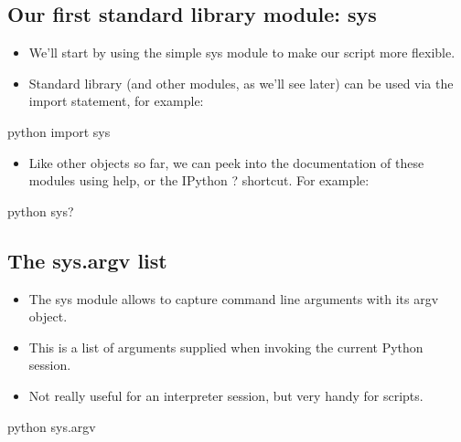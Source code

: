 \documentclass[aspectratio=1610,slidestop]{beamer}
\begin{document}
\subsection{Our first standard library module: sys}
\begin{pframe}
 \begin{itemize}
  \item We'll start by using the simple sys module to make our script more
  flexible.
  \item Standard library (and other modules, as we'll see later) can be used
  via the import statement, for example:
 \end{itemize}

 \begin{ipython}
   \begin{pythonin}{python}
import sys
   \end{pythonin}
 \end{ipython}

\begin{itemize}
 \item Like other objects so far, we can peek into the documentation of these
 modules using help, or the IPython ? shortcut. For example:
\end{itemize}
 \begin{ipython}
   \begin{pythonin}{python}
sys?
   \end{pythonin}
 \end{ipython}
\end{pframe}


\subsection{The sys.argv list}
\begin{pframe}
  \begin{itemize}
   \item The sys module allows to capture command line arguments with its argv
  object.
  \item This is a list of arguments supplied when invoking the current Python
  session.
  \item Not really useful for an interpreter session, but very handy for
  scripts.
  \end{itemize}
 \begin{ipython}
   \begin{pythonin}{python}
sys.argv
   \end{pythonin}
   \\
   \begin{pythonout}
   \end{pythonout}
 \end{ipython}
\end{pframe}
\end{document}
